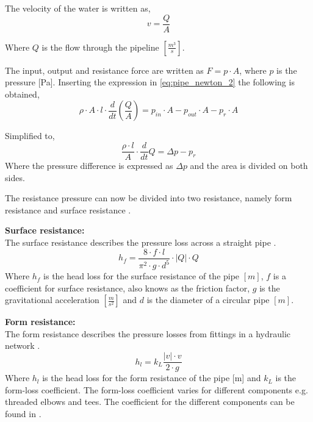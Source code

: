The velocity of the water is written as,
\begin{equation}
v=\frac{Q}{A} 
\end{equation}

Where $Q$ is the flow through the pipeline $\left[\frac{m^3}{s}\right]$.

The input, output and resistance force are written as $F=p \cdot A$, where $p$ is the pressure [Pa]. Inserting the expression in \ref{eq:pipe_newton_2} the following is obtained,
\begin{equation}
\rho \cdot A \cdot l \cdot \frac{d}{dt}\left(\frac{Q}{A}\right) = p_{in}\cdot A - p_{out}\cdot A - p_r \cdot A 
\end{equation}

Simplified to,
\begin{equation}\label{eq:pipe_w_pr}
\frac{\rho \cdot l}{A}\cdot \frac{d}{dt}Q = \Delta p - p_r
\end{equation}
Where the pressure difference is expressed as $\Delta p$ and the area is divided on both sides.

The resistance pressure can now be divided into two resistance, namely form resistance and surface resistance \cite{swamee_pipe}. 

\textbf{Surface resistance:}\\
The surface resistance describes the pressure loss across a straight pipe \cite{swamee_pipe}.
\begin{equation}\label{eq:surface_resistance}
h_f=\frac{8\cdot f\cdot l}{\pi^2\cdot g\cdot d^5} \cdot |Q|\cdot Q
\end{equation}
Where $h_f$ is the head loss for the surface resistance of the pipe $[m]$, $f$ is a coefficient for surface resistance, also knows as the friction factor, $g$ is the gravitational acceleration $\left[\frac{m}{s^2}\right]$ and $d$ is the diameter of a circular pipe $[m]$.

\textbf{Form resistance:}\\
The form resistance describes the pressure losses from fittings in a hydraulic network \cite{swamee_pipe}. 
\begin{equation} \label{eq:form_resistance}
h_l=k_L \frac{ |v|\cdot v }{2\cdot g}
\end{equation}
Where $h_l$ is the head loss for the form resistance of the pipe [m] and $k_L$ is the form-loss coefficient. The form-loss coefficient varies for different components e.g. threaded elbows and tees. The coefficient for the different components can be found in \cite{fundamentals_of_fluid_mechanics}. 

